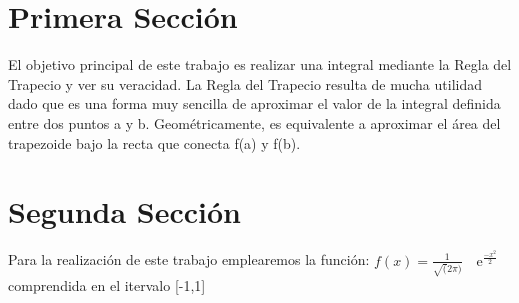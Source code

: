 

\section{Primera Sección}
\label{1:sec:1}
\parindent=0.5cm
\raggedright
El objetivo principal de este trabajo es realizar una integral mediante la Regla del Trapecio y ver
su veracidad. La Regla del Trapecio resulta de mucha utilidad dado que es una forma muy sencilla de
aproximar el valor de la integral definida entre dos puntos a y b. Geométricamente, es equivalente a
aproximar el área del  trapezoide bajo la recta que conecta f(a) y f(b).

\section{Segunda Sección}
\label{1:sec:2}
\parindent=0.5cm
\raggedright
Para la realización de este trabajo emplearemos la función:
$f(x)=\frac{1}{\sqrt(2\pi)} \quad\text{e}^{\frac{-x^2}{2}}$
comprendida en el itervalo [-1,1]
